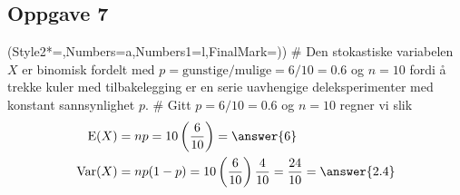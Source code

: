 \subsection*{Oppgave 7}
\begin{easylist}[enumerate]
	\ListProperties(Style2*=,Numbers=a,Numbers1=l,FinalMark={)})
	# Den stokastiske variabelen $X$ er binomisk fordelt med $p = \text{gunstige} / \text{mulige} =  6/10 = 0.6$ og $n = 10$ fordi å trekke kuler med tilbakelegging er en serie uavhengige deleksperimenter med konstant sannsynlighet $p$.
	# Gitt $p = 6/10 = 0.6$ og $n = 10$ regner vi slik
	\begin{align*}
		\operatorname{E}(X) &= np = 10 \left(\frac{6}{10}\right) = \answer{6} \\
		\operatorname{Var}(X) &= np(1-p) = 10 \left(\frac{6}{10}\right) \frac{4}{10} = \frac{24}{10} = \answer{2.4} 
	\end{align*}
\end{easylist}

